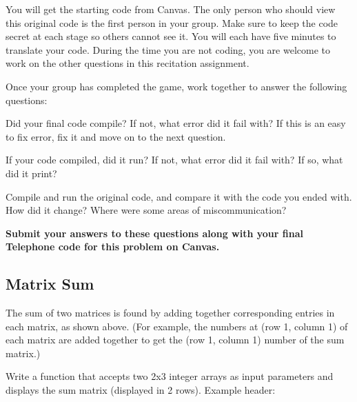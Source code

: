 You will get the starting code from Canvas. The only person who should view this original code is the first person in your group. Make sure to keep the code secret at each stage so others cannot see it. You will each have five minutes to translate your code. During the time you are not coding, you are welcome to work on the other questions in this recitation assignment. 

Once your group has completed the game, work together to answer the following questions:

\begin{multipart}
    Did your final code compile? If not, what error did it fail with? If this is an easy to fix error, fix it and move on to the next question.
\end{multipart}

\vspace{6cm}

\begin{multipart}
    If your code compiled, did it run? If not, what error did it fail with? If so, what did it print?
\end{multipart}

\vspace{6cm}

\begin{multipart}
    Compile and run the original code, and compare it with the code you ended with. How did it change? Where were some areas of miscommunication? 
\end{multipart}

\vspace{6cm}

\textbf{Submit your answers to these questions along with your final Telephone code for this problem on Canvas.}



\subsection{Matrix Sum}
The sum of two matrices is found by adding together corresponding entries in each matrix, as shown above. (For example, the numbers at (row 1, column 1) of each matrix are added together to get the (row 1, column 1) number of the sum matrix.)

Write a function that accepts two 2x3 integer arrays as input parameters and displays the sum matrix (displayed in 2 rows). Example header:

